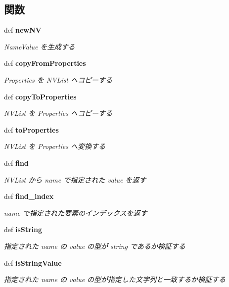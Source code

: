 \subsection*{関数}
\begin{CompactItemize}
\item 
def {\bf newNV}
\begin{CompactList}\small\item\em NameValue を生成する \item\end{CompactList}\item 
def {\bf copyFromProperties}
\begin{CompactList}\small\item\em Properties を NVList へコピーする \item\end{CompactList}\item 
def {\bf copyToProperties}
\begin{CompactList}\small\item\em NVList を Properties へコピーする \item\end{CompactList}\item 
def {\bf toProperties}
\begin{CompactList}\small\item\em NVList を Properties へ変換する \item\end{CompactList}\item 
def {\bf find}
\begin{CompactList}\small\item\em NVList から name で指定された value を返す \item\end{CompactList}\item 
def {\bf find\_\-index}
\begin{CompactList}\small\item\em name で指定された要素のインデックスを返す \item\end{CompactList}\item 
def {\bf isString}
\begin{CompactList}\small\item\em 指定された name の value の型が string であるか検証する \item\end{CompactList}\item 
def {\bf isStringValue}
\begin{CompactList}\small\item\em 指定された name の value の型が指定した文字列と一致するか検証する \item\end{CompactList}\item 

\end{CompactItemize}

